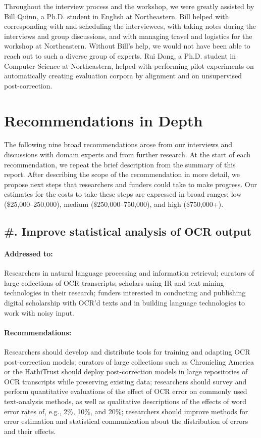 \documentclass[twoside,11pt]{report}
\newcounter{reccounter}
\renewcommand{\thereccounter}{\arabic{reccounter}}
\newcommand{\recommend}[2]{\refstepcounter{reccounter}%
  \label{rec:#1}%
  \subsection{\#\thereccounter. #2}%
  \label{sec:rec-#1}}
\begin{document}
Throughout the interview process and the workshop, we were greatly assisted by Bill Quinn, a Ph.D. student in English at Northeastern. Bill helped with corresponding with and scheduling the interviewees, with taking notes during the interviews and group discussions, and with managing travel and logistics for the workshop at Northeastern. Without Bill's help, we would not have been able to reach out to such a diverse group of experts. Rui Dong, a Ph.D. student in Computer Science at Northeastern, helped with performing pilot experiments on automatically creating evaluation corpora by alignment and on unsupervised post-correction.

\newpage

\section{Recommendations in Depth}

The following nine broad recommendations arose from our interviews and discussions with domain experts and from further research. At the start of each recommendation, we repeat the brief description from the summary of this report. After describing the scope of the recommendation in more detail, we propose next steps that researchers and funders could take to make progress. Our estimates for the costs to take these steps are expressed in broad ranges: low (\$25,000--250,000), medium (\$250,000--750,000), and high (\$750,000+).

\recommend{stats}{Improve statistical analysis of OCR output}

\paragraph{Addressed to:} Researchers in natural language processing and information retrieval; curators of large collections of OCR transcripts; scholars using IR and text mining technologies in their research; funders interested in conducting and publishing digital scholarship with OCR'd texts and in building language technologies to work with noisy input.

\paragraph{Recommendations:} Researchers should develop and distribute tools for training and adapting OCR post-correction models; curators of large collections such as Chronicling America or the HathiTrust should deploy post-correction models in large repositories of OCR transcripts while preserving existing data; researchers should survey and perform quantitative evaluations of the effect of OCR error on commonly used text-analysis methods, as well as qualitative descriptions of the effects of word error rates of, e.g., 2\%, 10\%, and 20\%; researchers should improve methods for error estimation and statistical communication about the distribution of errors and their effects.
\end{document}
